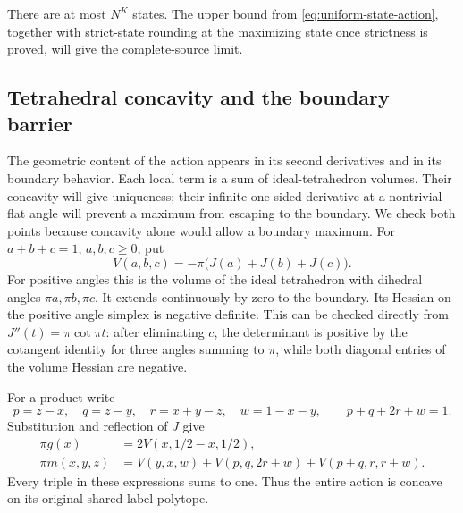\documentclass[11pt]{article}
\numberwithin{equation}{section}
\theoremstyle{definition}\newtheorem{definition}[theorem]{Definition}
\theoremstyle{remark}\newtheorem{remark}[theorem]{Remark}
\begin{document}
There are at most $N^K$ states. The upper bound from \eqref{eq:uniform-state-action}, together with strict-state rounding at the maximizing state once strictness is proved, will give the complete-source limit.

\subsection{Tetrahedral concavity and the boundary barrier}

The geometric content of the action appears in its second derivatives and in its boundary behavior. Each local term is a sum of ideal-tetrahedron volumes. Their concavity will give uniqueness; their infinite one-sided derivative at a nontrivial flat angle will prevent a maximum from escaping to the boundary. We check both points because concavity alone would allow a boundary maximum.
For $a+b+c=1$, $a,b,c\ge0$, put
\[
 V(a,b,c)=-\pi\bigl(J(a)+J(b)+J(c)\bigr).
\]
For positive angles this is the volume of the ideal tetrahedron with dihedral angles $\pi a,\pi b,\pi c$. It extends continuously by zero to the boundary. Its Hessian on the positive angle simplex is negative definite. This can be checked directly from $J''(t)=\pi\cot\pi t$: after eliminating $c$, the determinant is positive by the cotangent identity for three angles summing to $\pi$, while both diagonal entries of the volume Hessian are negative.

For a product write
\[
 p=z-x,\quad q=z-y,\quad r=x+y-z,\quad w=1-x-y,
 \qquad p+q+2r+w=1.
\]
Substitution and reflection of $J$ give
\begin{align}
 \pi g(x)&=2V(x,1/2-x,1/2),\label{eq:leaf-atoms}\\
 \pi m(x,y,z)&=V(y,x,w)+V(p,q,2r+w)
                  +V(p+q,r,r+w).\label{eq:gate-atoms}
\end{align}
Every triple in these expressions sums to one. Thus the entire action is concave on its original shared-label polytope.
\end{document}
